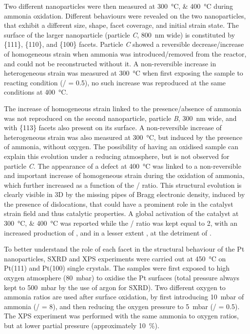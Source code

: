 Two different nanoparticles were then measured at \qtylist{300;400}{\degreeCelsius} during ammonia oxidation.
Different behaviours were revealed on the two nanoparticles, that exhibit a different size, shape, facet coverage, and initial strain state.
The surface of the larger nanoparticle (particle \textit{C}, \qty{800}{\nm} wide) is constituted by  \{111\}, \{110\}, and \{100\} facets.
Particle \textit{C} showed a reversible decrease/increase of homogeneous strain when ammonia was introduced/removed from the reactor, and could not be reconstructed without it.
A non-reversible increase in heterogeneous strain was measured at \qty{300}{\degreeCelsius} when first exposing the sample to reacting condition (/ = 0.5), no such increase was reproduced at the same conditions at \qty{400}{\degreeCelsius}.

The increase of homogeneous strain linked to the presence/absence of ammonia was not reproduced on the second nanoparticle, particle \textit{B}, \qty{300}{\nm} wide, and with \{113\} facets also present on its surface.
A non-reversible increase of heterogeneous strain was also measured at \qty{300}{\degreeCelsius}, but induced by the presence of ammonia, without oxygen.
The possibility of having an oxidised sample can explain this evolution under a reducing atmosphere, but is not observed for particle \textit{C}.
The appearance of a defect at \qty{400}{\degreeCelsius} was linked to a non-reversible and important increase of homogeneous strain during the oxidation of ammonia, which further increased as a function of the / ratio.
This structural evolution is clearly visible in 3D by the missing pipes of Bragg electronic density, induced by the presence of dislocations, that could have a prominent role in the catalyst strain field and thus catalytic properties.
A global activation of the catalyst at \qtylist{300;400}{\degreeCelsius} was reported while the / ratio was kept equal to 2, with an increased production of , and in a lesser extent , at the detriment of .

To better understand the role of each facet in the structural behaviour of the Pt nanoparticles, SXRD and XPS experiments were carried out at \qty{450}{\degreeCelsius} on Pt(111) and Pt(100) single crystals.
The samples were first exposed to high oxygen atmosphere (\qty{80}{\milli\bar}) to oxidise the Pt surfaces (total pressure always kept to \qty{500}{\milli\bar} by the use of argon for SXRD).
Two different oxygen to ammonia ratios are used after surface oxidation, by first introducing \qty{10}{\milli\bar} of ammonia (/ = \num{8}), and then reducing the oxygen pressure to \qty{5}{\milli\bar} (/ = \num{0.5}).
The XPS experiment was performed with the same ammonia to oxygen ratios, but at lower partial pressure (approximately \qty{10}{\percent}).

